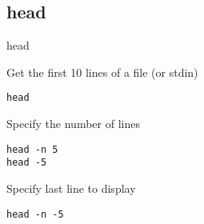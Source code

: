 \subsection{head}

\begin{frame}[fragile]{head}
  \begin{exampleblock}{Get the first 10 lines of a file (or stdin)}
    \begin{lstlisting}[showstringspaces=false,basicstyle=\tiny]
head
    \end{lstlisting}
  \end{exampleblock}
\pause

  \begin{exampleblock}{Specify the number of lines}
    \begin{lstlisting}[showstringspaces=false,basicstyle=\tiny]
head -n 5
head -5
    \end{lstlisting}
  \end{exampleblock}
\pause

  \begin{exampleblock}{Specify last line to display}
    \begin{lstlisting}[showstringspaces=false,basicstyle=\tiny]
head -n -5
    \end{lstlisting}
  \end{exampleblock}
\end{frame}

